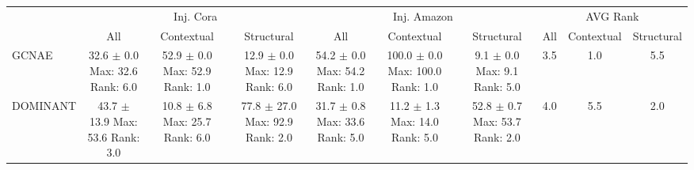 \begin{longtable}{|l|c|c|c|c|c|c|c|c|c|}
\hline
 & \multicolumn{3}{|c|}{Inj. Cora} & \multicolumn{3}{|c|}{Inj. Amazon} & \multicolumn{3}{|c|}{AVG Rank} \\ \cline{2-10}
 & All & Contextual & Structural & All & Contextual & Structural & All & Contextual & Structural \\ \hline
GCNAE & \makecell{ 32.6 $\pm$ 0.0 \\ \scriptsize Max: 32.6 \\ \scriptsize Rank: 6.0 } & \makecell{ 52.9 $\pm$ 0.0 \\ \scriptsize Max: 52.9 \\ \scriptsize Rank: 1.0 } & \makecell{ 12.9 $\pm$ 0.0 \\ \scriptsize Max: 12.9 \\ \scriptsize Rank: 6.0 } & \makecell{ 54.2 $\pm$ 0.0 \\ \scriptsize Max: 54.2 \\ \scriptsize Rank: 1.0 } & \makecell{ 100.0 $\pm$ 0.0 \\ \scriptsize Max: 100.0 \\ \scriptsize Rank: 1.0 } & \makecell{ 9.1 $\pm$ 0.0 \\ \scriptsize Max: 9.1 \\ \scriptsize Rank: 5.0 } & 3.5 & 1.0 & 5.5 \\ \hline 
DOMINANT & \makecell{ 43.7 $\pm$ 13.9 \\ \scriptsize Max: 53.6 \\ \scriptsize Rank: 3.0 } & \makecell{ 10.8 $\pm$ 6.8 \\ \scriptsize Max: 25.7 \\ \scriptsize Rank: 6.0 } & \makecell{ 77.8 $\pm$ 27.0 \\ \scriptsize Max: 92.9 \\ \scriptsize Rank: 2.0 } & \makecell{ 31.7 $\pm$ 0.8 \\ \scriptsize Max: 33.6 \\ \scriptsize Rank: 5.0 } & \makecell{ 11.2 $\pm$ 1.3 \\ \scriptsize Max: 14.0 \\ \scriptsize Rank: 5.0 } & \makecell{ 52.8 $\pm$ 0.7 \\ \scriptsize Max: 53.7 \\ \scriptsize Rank: 2.0 } & 4.0 & 5.5 & 2.0 \\ \hline 

\end{longtable}
